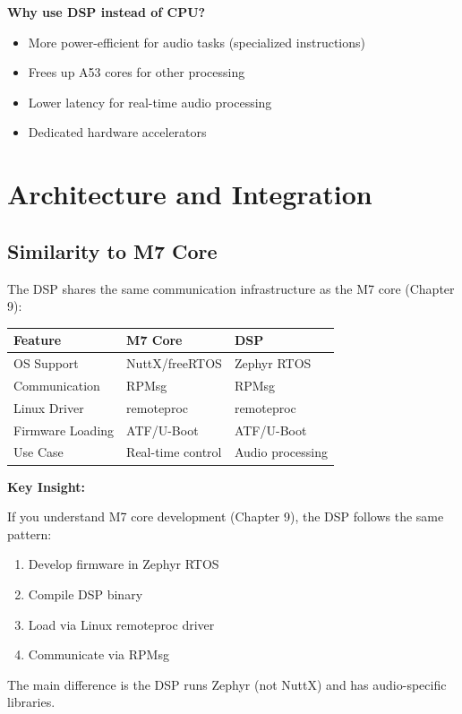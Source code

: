 \documentclass[12pt,a4paper]{report}
\begin{document}
\textbf{Why use DSP instead of CPU?}
\begin{itemize}
    \item More power-efficient for audio tasks (specialized instructions)
    \item Frees up A53 cores for other processing
    \item Lower latency for real-time audio processing
    \item Dedicated hardware accelerators
\end{itemize}

\section{Architecture and Integration}

\subsection{Similarity to M7 Core}

The DSP shares the same communication infrastructure as the M7 core (Chapter 9):

\begin{center}
\begin{tabular}{|l|l|l|}
\hline
\textbf{Feature} & \textbf{M7 Core} & \textbf{DSP} \\
\hline
OS Support & NuttX/freeRTOS & Zephyr RTOS \\
\hline
Communication & RPMsg & RPMsg \\
\hline
Linux Driver & remoteproc & remoteproc \\
\hline
Firmware Loading & ATF/U-Boot & ATF/U-Boot \\
\hline
Use Case & Real-time control & Audio processing \\
\hline
\end{tabular}
\end{center}

\begin{important}
\textbf{Key Insight:}

If you understand M7 core development (Chapter 9), the DSP follows the same pattern:
\begin{enumerate}
    \item Develop firmware in Zephyr RTOS
    \item Compile DSP binary
    \item Load via Linux remoteproc driver
    \item Communicate via RPMsg
\end{enumerate}

The main difference is the DSP runs Zephyr (not NuttX) and has audio-specific libraries.
\end{important}
\end{document}
